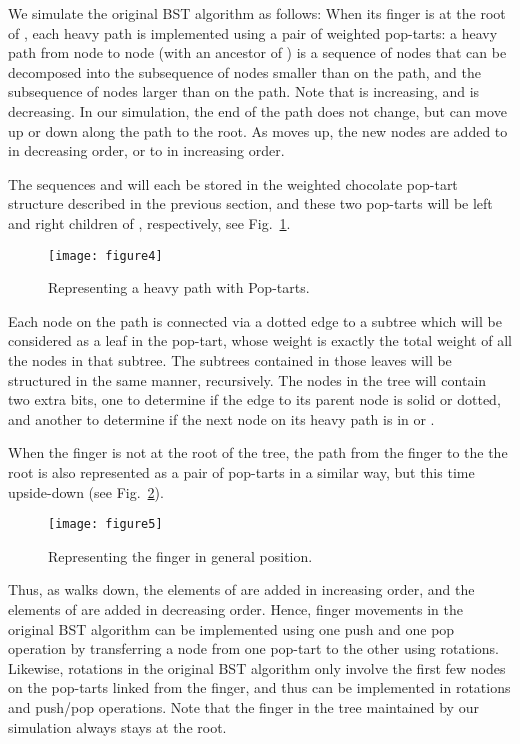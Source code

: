 \documentclass[11pt]{article}
\begin{document}
We simulate the original BST algorithm as follows: When its finger is at
the root of , each heavy path is implemented using a pair of weighted
pop-tarts: a heavy path from node  to node  (with  an ancestor
of ) is a sequence of nodes that can be decomposed into the
subsequence  of nodes smaller than  on the path, and the
subsequence  of nodes larger than  on the path. Note that
 is increasing, and  is decreasing. In our simulation,
the end of the path  does not change, but  can move up or down
along the path to the root. As  moves up, the new nodes are added to
 in decreasing order, or to  in increasing order.

The sequences  and  will each be stored in the weighted
chocolate pop-tart structure described in the previous section, and
these two pop-tarts will be left and right children of ,
respectively, see Fig.~\ref{fig:double-pop-tart}.
\begin{figure}
\begin{center}
\texttt{[image: figure4]}
\end{center}
\caption{Representing a heavy path with Pop-tarts.}
\label{fig:double-pop-tart}
\end{figure}
Each node on the path is connected via a dotted edge to a subtree which
will be considered as a leaf in the pop-tart, whose weight is exactly
the total weight of all the nodes in that subtree. The subtrees
contained in those leaves will be structured in the same manner,
recursively.  The nodes in the tree will contain two extra bits, one to
determine if the edge to its parent node is solid or dotted, and another
to determine if the next node on its heavy path is in  or
.

When the finger  is not at the root  of the tree, the path from
the finger to the the root is also represented as a pair of pop-tarts in
a similar way, but this time upside-down (see Fig.~\ref{fig:finger}).
\begin{figure}
\begin{center}
\texttt{[image: figure5]}
\end{center}
\caption{Representing the finger in general position.}
\label{fig:finger}
\end{figure}
Thus, as  walks down, the elements of  are added in
increasing order, and the elements of  are added in decreasing
order.  Hence, finger movements in the original BST algorithm can be
implemented using one push and one pop operation by transferring a node
from one pop-tart to the other using  rotations. Likewise,
rotations in the original BST algorithm only involve the first few nodes
on the pop-tarts linked from the finger, and thus can be implemented in
 rotations and push/pop operations. Note that the finger in the
tree maintained by our simulation always stays at the root.
\end{document}
